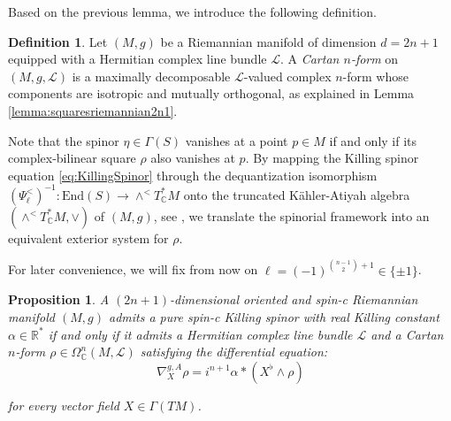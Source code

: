 \documentclass[10pt,a4paper,twoside,reqno]{amsart}
\theoremstyle{plain}
\newtheorem{prop}[thm]{Proposition}
\theoremstyle{definition}
\newtheorem{definition}[thm]{Definition}
\theoremstyle{remark}
\def\cL{\mathcal{L}}
\begin{document}
Based on the previous lemma, we introduce the following definition. 
 
\begin{definition}
Let $(M,g)$ be a Riemannian manifold of dimension $d = 2n+1$ equipped with a Hermitian complex line bundle $\cL$. A \emph{Cartan $n$-form} on $(M,g,\cL)$ is a maximally decomposable $\mathcal{L}$-valued complex $n$-form whose components are isotropic and mutually orthogonal, as explained in Lemma \ref{lemma:squaresriemannian2n1}.
\end{definition}

Note that the spinor $\eta\in\Gamma(S)$ vanishes at a point $p\in M$ if and only if its complex-bilinear square $\rho$ also vanishes at $p$. By mapping the Killing spinor equation \eqref{eq:KillingSpinor} through the dequantization isomorphism $(\Psi_\ell^<)^{-1} \colon \mathrm{End}(S) \to \wedge^< T^*_\mathbb{C} M$ onto the truncated Kähler-Atiyah algebra $(\wedge^< T^*_{\mathbb{C}}M, \vee)$ of $(M,g)$, see \cite{Algebraic_Complex_Square_2025,Complex_Differential_Spinors_2026}, we translate the spinorial framework into an equivalent exterior system for $\rho$.\medskip

For later convenience, we will fix from now on $\ell=(-1)^{\binom{n-1}{2}+1}\in\{\pm1\}$.

\begin{prop}
\label{prop:KillingSpinorBilinear}
A $(2n+1)$-dimensional oriented and spin-c Riemannian manifold $(M,g)$ admits a pure spin-c Killing spinor with real Killing constant $\alpha \in \mathbb{R}^{\ast}$ if and only if it admits a Hermitian complex line bundle $\cL$ and a Cartan $n$-form $\rho \in \Omega^n_{\mathbb{C}}(M, \mathcal{L})$ satisfying the differential equation:
\begin{equation*}
\nabla^{g,A}_X \rho = i^{n+1}\alpha \ast (X^\flat \wedge \rho)
\end{equation*}

\noindent
for every vector field $X \in \Gamma(TM)$.
\end{prop}
\end{document}
